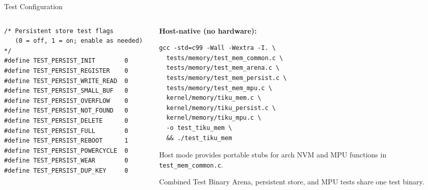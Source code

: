 \documentclass[aspectratio=169, 10pt]{beamer}
\begin{document}
\begin{frame}[fragile]{Test Configuration}
\begin{columns}[T]
\begin{column}{0.48\textwidth}
\begin{lstlisting}[style=cstyle, title={tests/tiku\_test\_config.h}]
/* Persistent store test flags
   (0 = off, 1 = on; enable as needed) */
#define TEST_PERSIST_INIT        0
#define TEST_PERSIST_REGISTER    0
#define TEST_PERSIST_WRITE_READ  0
#define TEST_PERSIST_SMALL_BUF   0
#define TEST_PERSIST_OVERFLOW    0
#define TEST_PERSIST_NOT_FOUND   0
#define TEST_PERSIST_DELETE      0
#define TEST_PERSIST_FULL        0
#define TEST_PERSIST_REBOOT      1
#define TEST_PERSIST_POWERCYCLE  0
#define TEST_PERSIST_WEAR        0
#define TEST_PERSIST_DUP_KEY     0
\end{lstlisting}
\end{column}

\begin{column}{0.48\textwidth}
\textbf{Host-native (no hardware):}
\begin{lstlisting}[style=bashstyle]
gcc -std=c99 -Wall -Wextra -I. \
  tests/memory/test_mem_common.c \
  tests/memory/test_mem_arena.c \
  tests/memory/test_mem_persist.c \
  tests/memory/test_mem_mpu.c \
  kernel/memory/tiku_mem.c \
  kernel/memory/tiku_persist.c \
  kernel/memory/tiku_mpu.c \
  -o test_tiku_mem \
  && ./test_tiku_mem
\end{lstlisting}

\vspace{0.3em}
Host mode provides portable stubs for arch NVM and
MPU functions in \texttt{test\_mem\_common.c}.

\vspace{0.5em}
\begin{block}{Combined Test Binary}
Arena, persistent store, and MPU tests share one
test binary.
\end{block}
\end{column}
\end{columns}
\end{frame}
\end{document}
